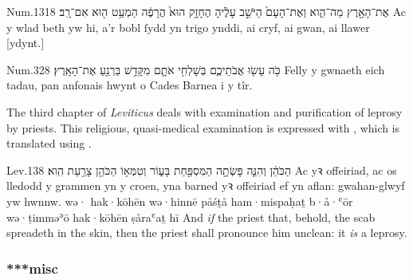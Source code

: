 \begin{example}{Num.}{13}{18}{}{}
	\quoling
	{ אֶת־הָאָ֖רֶץ מַה־הִ֑וא וְאֶת־הָעָם֙ הַיֹּשֵׁ֣ב עָלֶ֔יהָ הֶחָזָ֥ק הוּא֙ הֲרָפֶ֔ה הַמְעַ֥ט ה֖וּא אִם־רָֽב׃}
	{Ac  y wlad beth yw hi, a’r bobl ſydd yn trigo ynddi, ai cryf, ai gwan, ai llawer [ydynt.]}
	{\tounfold{***}}
	{\tounfold{***}}
\end{example}

\begin{example}{Num.}{32}{8}{}{}
	\quoling
	{כֹּ֥ה עָשׂ֖וּ אֲבֹתֵיכֶ֑ם בְּשָׁלְחִ֥י אֹתָ֛ם מִקָּדֵ֥שׁ בַּרְנֵ֖עַ  אֶת־הָאָֽרֶץ׃}
	{Felly y gwnaeth eich tadau, pan anfonais hwynt o Cades Barnea i  y tîr.}
	{\tounfold{***}}
	{\tounfold{***}}
\end{example}




\begin{paper}
	The third chapter of \emph{Leviticus} deals with examination and purification of leprosy by priests. This religious, quasi-medical examination is expressed with , which is translated using .
\end{paper}

\begin{example}{Lev.}{13}{8}{}{}
	\quoling
	{ הַכֹּהֵ֔ן וְהִנֵּ֛ה פָּשְׂתָ֥ה הַמִּסְפַּ֖חַת בָּע֑וֹר וְטִמְּא֥וֹ הַכֹּהֵ֖ן צָרַ֥עַת הִֽוא׃}
	{Ac  yꝛ offeiriad, ac os lledodd y grammen yn y croen, yna barned yꝛ offeiriad ef yn aflan: gwahan-glwyf yw hwnnw.}
	{wə· hak·kōhēn wə·hinnē påśṯå ham·mispaḥaṯ b·å·ʿōr wə·ṭimməʾō hak·kōhēn ṣåraʿaṯ hī}
	{And \emph{if} the priest  that, behold, the scab spreadeth in the skin, then the priest shall pronounce him unclean: it \emph{is} a leprosy.}
\end{example}










\subsubsection{***misc}





\subsubsection{}


